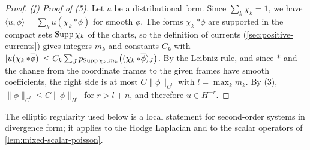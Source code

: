 \begin{proof}
\emph{(f) Proof of (5).} Let $u$ be a distributional form. Since $\sum_k\chi_k=1$, we have $\langle u,\phi\rangle=\sum_ku(\chi_k\,{*\overline\phi})$ for smooth $\phi$. The forms $\chi_k\,{*\overline\phi}$ are supported in the compact sets $\operatorname{Supp}\chi_k$ of the charts, so the definition of currents (\cref{sec:positive-currents}) gives integers $m_k$ and constants $C_k$ with $|u(\chi_k\,{*\overline\phi})|\leq C_k\sum_Jp_{\operatorname{Supp}\chi_k,m_k}\bigl((\chi_k\,{*\overline\phi})_J\bigr)$. By the Leibniz rule, and since $*$ and the change from the coordinate frames to the given frames have smooth coefficients, the right side is at most $C\|\phi\|_{C^l}$ with $l=\max_km_k$. By (3), $\|\phi\|_{C^l}\leq C\|\phi\|_{H^r}$ for $r>l+n$, and therefore $u\in H^{-r}$.
\end{proof}

The elliptic regularity used below is a local statement for second-order systems in divergence form; it applies to the Hodge Laplacian and to the scalar operators of \cref{lem:mixed-scalar-poisson}.

